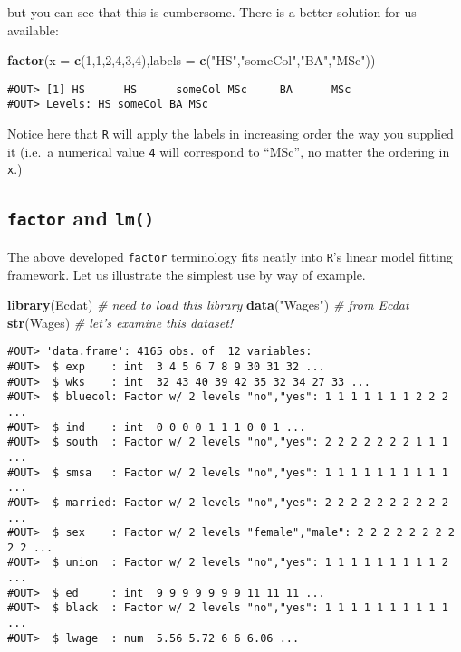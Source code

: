\documentclass[]{book}
\newenvironment{Shaded}{\begin{snugshade}}{\end{snugshade}}
\newcommand{\KeywordTok}[1]{\textcolor[rgb]{0.13,0.29,0.53}{\textbf{#1}}}
\newcommand{\DataTypeTok}[1]{\textcolor[rgb]{0.13,0.29,0.53}{#1}}
\newcommand{\DecValTok}[1]{\textcolor[rgb]{0.00,0.00,0.81}{#1}}
\newcommand{\StringTok}[1]{\textcolor[rgb]{0.31,0.60,0.02}{#1}}
\newcommand{\CommentTok}[1]{\textcolor[rgb]{0.56,0.35,0.01}{\textit{#1}}}
\newcommand{\NormalTok}[1]{#1}
\begin{document}
but you can see that this is cumbersome. There is a better solution for
us available:

\begin{Shaded}
\begin{Highlighting}[]
\KeywordTok{factor}\NormalTok{(}\DataTypeTok{x =} \KeywordTok{c}\NormalTok{(}\DecValTok{1}\NormalTok{,}\DecValTok{1}\NormalTok{,}\DecValTok{2}\NormalTok{,}\DecValTok{4}\NormalTok{,}\DecValTok{3}\NormalTok{,}\DecValTok{4}\NormalTok{),}\DataTypeTok{labels =} \KeywordTok{c}\NormalTok{(}\StringTok{"HS"}\NormalTok{,}\StringTok{"someCol"}\NormalTok{,}\StringTok{"BA"}\NormalTok{,}\StringTok{"MSc"}\NormalTok{))}
\end{Highlighting}
\end{Shaded}

\begin{verbatim}
#OUT> [1] HS      HS      someCol MSc     BA      MSc    
#OUT> Levels: HS someCol BA MSc
\end{verbatim}

Notice here that \texttt{R} will apply the labels in increasing order
the way you supplied it (i.e.~a numerical value \texttt{4} will
correspond to ``MSc'', no matter the ordering in \texttt{x}.)

\subsection{\texorpdfstring{\texttt{factor} and
\texttt{lm()}}{factor and lm()}}\label{factor-and-lm}

The above developed \texttt{factor} terminology fits neatly into
\texttt{R}'s linear model fitting framework. Let us illustrate the
simplest use by way of example.

\begin{Shaded}
\begin{Highlighting}[]
\KeywordTok{library}\NormalTok{(Ecdat)  }\CommentTok{# need to load this library}
\KeywordTok{data}\NormalTok{(}\StringTok{"Wages"}\NormalTok{)   }\CommentTok{# from Ecdat}
\KeywordTok{str}\NormalTok{(Wages)   }\CommentTok{# let's examine this dataset!}
\end{Highlighting}
\end{Shaded}

\begin{verbatim}
#OUT> 'data.frame': 4165 obs. of  12 variables:
#OUT>  $ exp    : int  3 4 5 6 7 8 9 30 31 32 ...
#OUT>  $ wks    : int  32 43 40 39 42 35 32 34 27 33 ...
#OUT>  $ bluecol: Factor w/ 2 levels "no","yes": 1 1 1 1 1 1 1 2 2 2 ...
#OUT>  $ ind    : int  0 0 0 0 1 1 1 0 0 1 ...
#OUT>  $ south  : Factor w/ 2 levels "no","yes": 2 2 2 2 2 2 2 1 1 1 ...
#OUT>  $ smsa   : Factor w/ 2 levels "no","yes": 1 1 1 1 1 1 1 1 1 1 ...
#OUT>  $ married: Factor w/ 2 levels "no","yes": 2 2 2 2 2 2 2 2 2 2 ...
#OUT>  $ sex    : Factor w/ 2 levels "female","male": 2 2 2 2 2 2 2 2 2 2 ...
#OUT>  $ union  : Factor w/ 2 levels "no","yes": 1 1 1 1 1 1 1 1 1 2 ...
#OUT>  $ ed     : int  9 9 9 9 9 9 9 11 11 11 ...
#OUT>  $ black  : Factor w/ 2 levels "no","yes": 1 1 1 1 1 1 1 1 1 1 ...
#OUT>  $ lwage  : num  5.56 5.72 6 6 6.06 ...
\end{verbatim}
\end{document}
